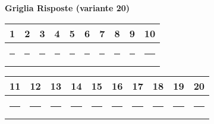 \documentclass{exam}%
\newcounter{variant}%
\begin{document}
%
\normalsize%
\setcounter{variant}{20}%
\noindent \textbf{  }%
\bigskip%
\noindent\textbf{Griglia Risposte (variante 20)}%
\begin{center}
\begin{tabular}{|c|c|c|c|c|c|c|c|c|c|}
\hline
1 & 2 & 3 & 4 & 5 & 6 & 7 & 8 & 9 & 10 \\ \hline
\rule{1cm}{0pt}\rule[-0.5em]{0pt}{1.5em} & \rule{1cm}{0pt}\rule[-0.5em]{0pt}{1.5em} & \rule{1cm}{0pt}\rule[-0.5em]{0pt}{1.5em} & \rule{1cm}{0pt}\rule[-0.5em]{0pt}{1.5em} & \rule{1cm}{0pt}\rule[-0.5em]{0pt}{1.5em} & \rule{1cm}{0pt}\rule[-0.5em]{0pt}{1.5em} & \rule{1cm}{0pt}\rule[-0.5em]{0pt}{1.5em} & \rule{1cm}{0pt}\rule[-0.5em]{0pt}{1.5em} & \rule{1cm}{0pt}\rule[-0.5em]{0pt}{1.5em} & \rule{1cm}{0pt}\rule[-0.5em]{0pt}{1.5em} \\ \hline
\end{tabular}
\end{center}%
\vspace{0.3em}%
\begin{center}
\begin{tabular}{|c|c|c|c|c|c|c|c|c|c|}
\hline
11 & 12 & 13 & 14 & 15 & 16 & 17 & 18 & 19 & 20 \\ \hline
\rule{1cm}{0pt}\rule[-0.5em]{0pt}{1.5em} & \rule{1cm}{0pt}\rule[-0.5em]{0pt}{1.5em} & \rule{1cm}{0pt}\rule[-0.5em]{0pt}{1.5em} & \rule{1cm}{0pt}\rule[-0.5em]{0pt}{1.5em} & \rule{1cm}{0pt}\rule[-0.5em]{0pt}{1.5em} & \rule{1cm}{0pt}\rule[-0.5em]{0pt}{1.5em} & \rule{1cm}{0pt}\rule[-0.5em]{0pt}{1.5em} & \rule{1cm}{0pt}\rule[-0.5em]{0pt}{1.5em} & \rule{1cm}{0pt}\rule[-0.5em]{0pt}{1.5em} & \rule{1cm}{0pt}\rule[-0.5em]{0pt}{1.5em} \\ \hline
\end{tabular}
\end{center}%
\vspace{1em}%
\end{document}
